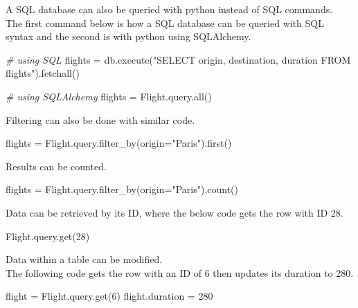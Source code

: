 \documentclass[]{book}
\newenvironment{Shaded}{\begin{snugshade}}{\end{snugshade}}
\newcommand{\StringTok}[1]{\textcolor[rgb]{0.31,0.60,0.02}{#1}}
\newcommand{\CommentTok}[1]{\textcolor[rgb]{0.56,0.35,0.01}{\textit{#1}}}
\newcommand{\ExtensionTok}[1]{#1}
\newcommand{\NormalTok}[1]{#1}
\begin{document}
A SQL database can also be queried with python instead of SQL
commands.\\
The first command below is how a SQL database can be queried with SQL
syntax and the second is with python using SQLAlchemy.

\begin{Shaded}
\begin{Highlighting}[]
\CommentTok{# using SQL}
\ExtensionTok{flights}\NormalTok{ = db.execute(}\StringTok{"SELECT origin, destination, duration FROM flights"}\NormalTok{)}\ExtensionTok{.fetchall}\NormalTok{()}

\CommentTok{# using SQLAlchemy}
\ExtensionTok{flights}\NormalTok{ = Flight.query.all()}
\end{Highlighting}
\end{Shaded}

Filtering can also be done with similar code.

\begin{Shaded}
\begin{Highlighting}[]
\ExtensionTok{flights}\NormalTok{ = Flight.query.filter_by(origin=}\StringTok{"Paris"}\NormalTok{)}\ExtensionTok{.first}\NormalTok{()}
\end{Highlighting}
\end{Shaded}

Results can be counted.

\begin{Shaded}
\begin{Highlighting}[]
\ExtensionTok{flights}\NormalTok{ = Flight.query.filter_by(origin=}\StringTok{"Paris"}\NormalTok{)}\ExtensionTok{.count}\NormalTok{()}
\end{Highlighting}
\end{Shaded}

Data can be retrieved by its ID, where the below code gets the row with
ID 28.

\begin{Shaded}
\begin{Highlighting}[]
\ExtensionTok{Flight.query.get}\NormalTok{(28)}
\end{Highlighting}
\end{Shaded}

Data within a table can be modified.\\
The following code gets the row with an ID of 6 then updates its
duration to 280.

\begin{Shaded}
\begin{Highlighting}[]
\ExtensionTok{flight}\NormalTok{ = Flight.query.get(6)}
\ExtensionTok{flight.duration}\NormalTok{ = 280}
\end{Highlighting}
\end{Shaded}
\end{document}
